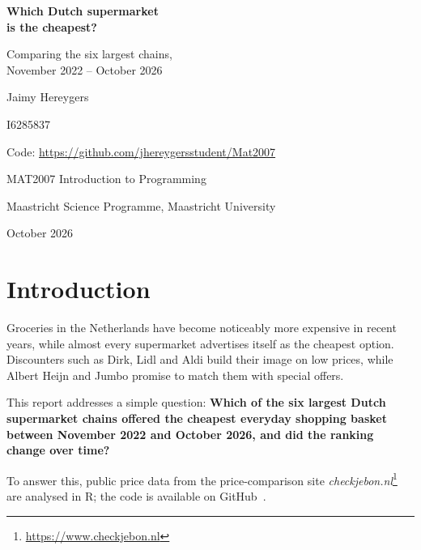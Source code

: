 \documentclass[10pt,a4paper]{article}
\begin{document}
\begin{titlepage}
  \centering
  \vspace*{4cm}
  {\Huge\bfseries Which Dutch supermarket\\[4pt] is the cheapest?\par}
  \vspace{0.8cm}
  {\Large Comparing the six largest chains,\\ November 2022 -- October 2026\par}
  \vspace{2.5cm}
  {\large Jaimy Hereygers\par}
  \vspace{0.2cm}
  {\large I6285837\par}
  \vspace{0.6cm}
  {\normalsize Code: \url{https://github.com/jhereygersstudent/Mat2007}\par}
  \vfill
  {\large MAT2007 Introduction to Programming\par}
  \vspace{0.2cm}
  {\large Maastricht Science Programme, Maastricht University\par}
  \vspace{0.6cm}
  {\large October 2026\par}
\end{titlepage}

\setcounter{page}{1}

\section*{Introduction}
Groceries in the Netherlands have become noticeably more expensive in recent years,
while almost every supermarket advertises itself as the cheapest option. Discounters
such as Dirk, Lidl and Aldi build their image on low prices, while Albert Heijn and
Jumbo promise to match them with special offers.

This report addresses a simple question: \textbf{Which of the six largest Dutch
supermarket chains offered the cheapest everyday shopping basket between November 2022
and October 2026, and did the ranking change over time?}

To answer this, public price data from the price-comparison site
\emph{checkjebon.nl}\footnote{\url{https://www.checkjebon.nl}} are analysed in R; the code is available on GitHub~\cite{code}.
\end{document}
